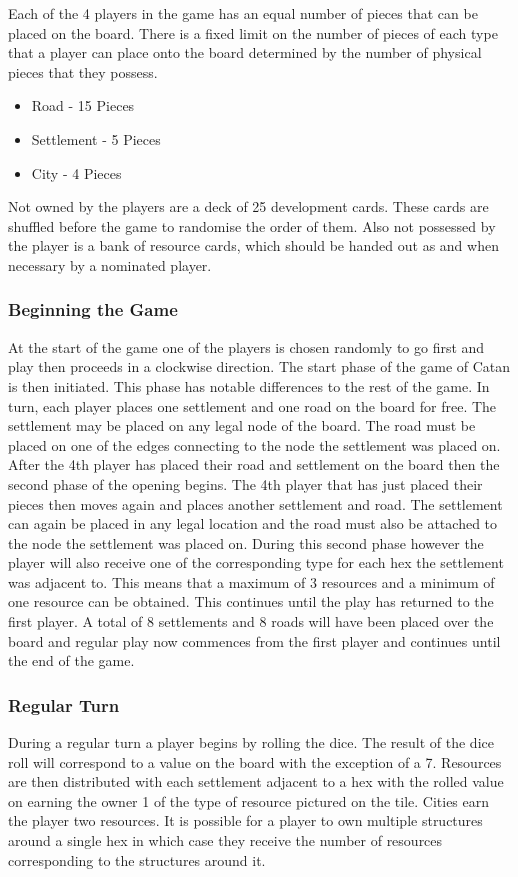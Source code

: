 \documentclass[]{article}
\begin{document}
\par Each of the 4 players in the game has an equal number of pieces that can be placed on the board. There is a fixed limit on the number of pieces of each type that a player can place onto the board determined by the number of physical pieces that they possess. 

\begin{itemize}
  \item Road - 15 Pieces
  \item Settlement - 5 Pieces
  \item City - 4 Pieces
\end{itemize}


\par Not owned by the players are a deck of 25 development cards. These cards are shuffled before the game to randomise the order of them. Also not possessed by the player is a bank of resource cards, which should be handed out as and when necessary by a nominated player.

\subsubsection{Beginning the Game}
At the start of the game one of the players is chosen randomly to go first and play then proceeds in a clockwise direction. The start phase of the game of Catan is then initiated. This phase has notable differences to the rest of the game. In turn, each player places one settlement and one road on the board for free. The settlement may be placed on any legal node of the board. The road must be placed on one of the edges connecting to the node the settlement was placed on. After the 4th player has placed their road and settlement on the board then the second phase of the opening begins. The 4th player that has just placed their pieces then moves again and places another settlement and road. The settlement can again be placed in any legal location and the road must also be attached to the node the settlement was placed on. During this second phase however the player will also receive one of the corresponding type for each hex the settlement was adjacent to. This means that a maximum of 3 resources and a minimum of one resource can be obtained. This continues until the play has returned to the first player. A total of 8 settlements and 8 roads will have been placed over the board and regular play now commences from the first player and continues until the end of the game.

\subsubsection{Regular Turn}
During a regular turn a player begins by rolling the dice. The result of the dice roll will correspond to a value on the board with the exception of a 7. Resources are then distributed with each settlement adjacent to a hex with the rolled value on earning the owner 1 of the type of resource pictured on the tile. Cities earn the player two resources. It is possible for a player to own multiple structures around a single hex in which case they receive the number of resources corresponding to the structures around it.
\end{document}
